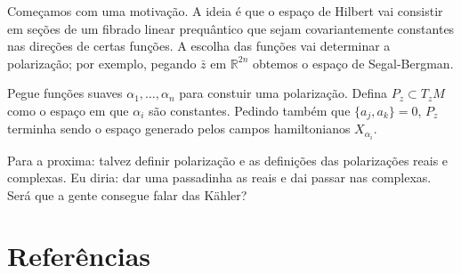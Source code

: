 Começamos com uma motivação. A ideia é que o espaço de Hilbert vai consistir em seções de um fibrado linear prequântico que sejam covariantemente constantes nas direções de certas funções. A escolha das funções vai determinar a polarização; por exemplo, pegando $\bar{z}$ em $\mathbb{R}^{2n}$ obtemos o espaço de Segal-Bergman.

Pegue funções suaves $\alpha_1,\ldots,\alpha_n$ para constuir uma polarização. Defina $P_z\subset T_zM$  como o espaço em que $\alpha_i$ são constantes. Pedindo também que $\{a_j,a_k\}=0$, $P_z$ terminha sendo o espaço generado pelos campos hamiltonianos $X_{\alpha_i}$.

Para a proxima: talvez definir polarização e as definições das polarizações reais e complexas. Eu diria: dar uma passadinha as reais e dai passar nas complexas. Será que a gente consegue falar das Kähler?
\fi

\section*{Referências}
\printbibliography[heading=none]

